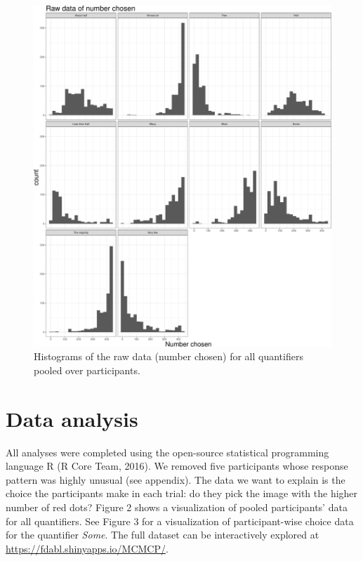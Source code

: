\documentclass[english,floatsintext,man]{apa6}
\begin{document}
\begin{figure}[htbp]
\centering
\includegraphics{manuscript_files/figure-latex/unnamed-chunk-5-1.pdf}
\caption{\label{fig:unnamed-chunk-5}Histograms of the raw data (number
chosen) for all quantifiers pooled over participants.}
\end{figure}

\section{Data analysis}\label{data-analysis}

All analyses were completed using the open-source statistical
programming language R (R Core Team, 2016). We removed five participants
whose response pattern was highly unusual (see appendix). The data we
want to explain is the choice the participants make in each trial: do
they pick the image with the higher number of red dots? Figure 2 shows a
visualization of pooled participants' data for all quantifiers. See
Figure 3 for a visualization of participant-wise choice data for the
quantifier \emph{Some}. The full dataset can be interactively explored
at
\mbox{\href{https://fdabl.shinyapps.io/MCMCP/}{https://fdabl.shinyapps.io/MCMCP/}}.
\end{document}
